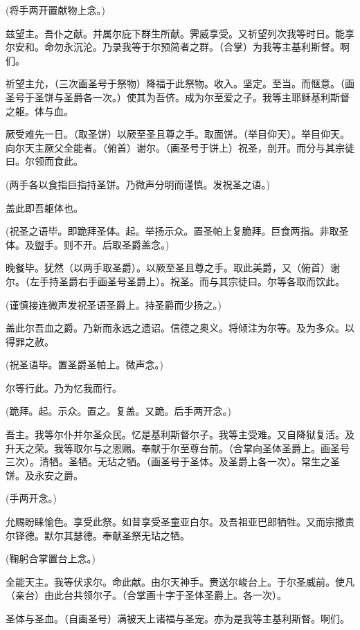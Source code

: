 \documentclass[UTF8,17pt]{ctexart}
\newcommand{\blood}[1]{\textcolor{Mahogany}{#1}}
\begin{document}
(将⼿两开置献物上念。)

兹望主。吾仆之献。并属尔庇下群⽣所献。霁威享受。又祈望列次我等时⽇。能享尔安和。命勿永沉沦。乃录我等于尔预简者之群。（合掌）为我等主基利斯督。啊们。

祈望主允，（三次画圣号于祭物）降\blood{\maltese}福于此祭物。收\blood{\maltese}⼊。坚\blood{\maltese}定。⾄\blood{\maltese}当。⽽惬意。（画圣号于圣饼与圣爵各⼀次。）使其为吾侪。成为尔⾄爱之⼦。我等主耶稣基利斯督之躯。\blood{\maltese}体与⾎\blood{\maltese}。

厥受难先⼀⽇。（取圣饼）以厥⾄圣且尊之⼿。取⾯饼。（举⽬仰天）。举⽬仰天。向尔天主厥⽗全能者。（俯⾸）谢尔。（画圣号于饼上）祝\blood{\maltese}圣，剖开。⽽分与其宗徒曰。尔领⽽⾷此。

(两⼿各以⾷指巨指持圣饼。乃微声分明⽽谨慎。发祝圣之语。)

盖此即吾躯体也。

(祝圣之语毕。即跪拜圣体。起。举扬⽰众。置圣帕上复脆拜。巨⾷两指。⾮取圣体。及盥⼿。则不开。后取圣爵盖念。)

晚餐毕。犹然（以两⼿取圣爵）。以厥⾄圣且尊之⼿。取此美爵，又（俯⾸）谢尔。（左⼿持圣爵右⼿画圣号圣爵上）。祝\blood{\maltese}圣。⽽与其宗徒曰。尔等各取⽽饮此。

(谨慎接连微声发祝圣语圣爵上。持圣爵⽽少扬之。)

盖此尔吾⾎之爵。乃新⽽永远之遗诏。信德之奥义。将倾注为尔等。及为多众。以得罪之赦。

(祝圣语毕。置圣爵圣帕上。微声念。)

尔等⾏此。乃为忆我⽽⾏。

(跪拜。起。⽰众。置之。复盖。又跪。后⼿两开念。)

吾主。我等尔仆并尔圣众民。忆是基利斯督尔⼦。我等主受难。又⾃降狱复活。及升天之荣。我等取尔与之恩赐。奉献于尔⾄尊台前。（合掌向圣体圣爵上。画圣号三次）。清\blood{\maltese}牺。圣\blood{\maltese}牺。⽆玷之\blood{\maltese}牺。（画圣号于圣体。及圣爵上各⼀次）。常⽣之圣\blood{\maltese}饼。及永安之爵\blood{\maltese}。

(⼿两开念。)

允赐盼睐愉⾊。享受此祭。如昔享受圣童亚⽩尔。及吾祖亚巴郎牺牲。又⽽宗撒责尔铎德。默尔其瑟德。奉献圣祭⽆玷之牺。

(鞠躬合掌置台上念。)

全能天主。我等伏求尔。命此献。由尔天神⼿。赉送尔峻台上。于尔圣威前。使凡（亲台）由此台共领尔⼦。（合掌画⼗字于圣体圣爵上。各⼀次）。

圣\blood{\maltese}体与圣⾎。（⾃画圣号）满被天上诸福与圣宠。亦为是我等主基利斯督。啊们。
\end{document}
